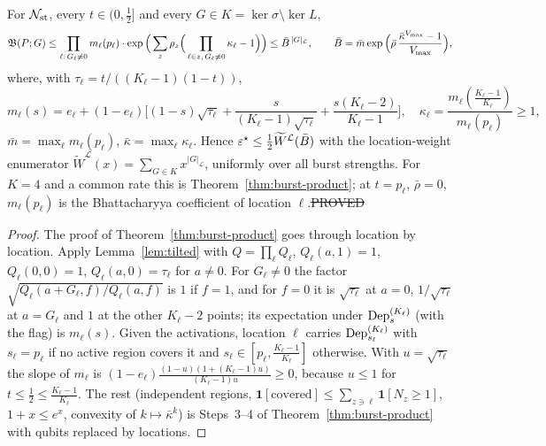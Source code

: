 \begin{theorem}\label{thm:st-burst}
For $\mathcal{N}_{\rm st}$, every $t\in(0,\tfrac12]$ and every $G\in K=\ker\sigma\setminus\ker L$,
\[
\mathfrak{B}(P;G)\le\prod_{\ell:\,G_\ell\ne0}m_\ell(p_\ell)\cdot\exp\Big(\sum_z\rho_z\Big(\prod_{\ell\in z,\,G_\ell\ne0}\kappa_\ell-1\Big)\Big)\le\bar B^{\,|G|_{\mathcal L}},\qquad
\bar B=\bar m\exp\Big(\bar\rho\,\frac{\bar\kappa^{V_{\max}}-1}{V_{\max}}\Big),
\]
where, with $\tau_\ell=t/((K_\ell-1)(1-t))$,
\[
m_\ell(s)=e_\ell+(1-e_\ell)\Big[(1-s)\sqrt{\tau_\ell}+\frac{s}{(K_\ell-1)\sqrt{\tau_\ell}}+\frac{s(K_\ell-2)}{K_\ell-1}\Big],\quad\kappa_\ell=\frac{m_\ell(\tfrac{K_\ell-1}{K_\ell})}{m_\ell(p_\ell)}\ge1,
\]
$\bar m=\max_\ell m_\ell(p_\ell)$, $\bar\kappa=\max_\ell\kappa_\ell$. Hence $\varepsilon^{\star}\le\tfrac12\widetilde W^{\mathcal L}(\bar B)$ with the location-weight enumerator $\widetilde W^{\mathcal L}(x)=\sum_{G\in K}x^{|G|_{\mathcal L}}$, uniformly over all burst strengths. For $K=4$ and a common rate this is Theorem~\ref{thm:burst-product}; at $t=p_\ell$, $\bar\rho=0$, $m_\ell(p_\ell)$ is the Bhattacharyya coefficient of location $\ell$.\hfill\st{PROVED}
\end{theorem}
\begin{proof}
The proof of Theorem~\ref{thm:burst-product} goes through location by location. Apply Lemma~\ref{lem:tilted} with $Q=\prod_\ell Q_\ell$, $Q_\ell(a,1)=1$, $Q_\ell(0,0)=1$, $Q_\ell(a,0)=\tau_\ell$ for $a\ne0$. For $G_\ell\ne0$ the factor $\sqrt{Q_\ell(a+G_\ell,f)/Q_\ell(a,f)}$ is $1$ if $f=1$, and for $f=0$ it is $\sqrt{\tau_\ell}$ at $a=0$, $1/\sqrt{\tau_\ell}$ at $a=G_\ell$ and $1$ at the other $K_\ell-2$ points; its expectation under $\mathrm{Dep}^{(K_\ell)}_s$ (with the flag) is $m_\ell(s)$.
Given the activations, location $\ell$ carries $\mathrm{Dep}^{(K_\ell)}_{s_\ell}$ with $s_\ell=p_\ell$ if no active region covers it and $s_\ell\in[p_\ell,\tfrac{K_\ell-1}{K_\ell}]$ otherwise. With $u=\sqrt{\tau_\ell}$ the slope of $m_\ell$ is $(1-e_\ell)\frac{(1-u)(1+(K_\ell-1)u)}{(K_\ell-1)u}\ge0$, because $u\le1$ for $t\le\tfrac12\le\tfrac{K_\ell-1}{K_\ell}$. The rest (independent regions, $\mathbf 1[\text{covered}]\le\sum_{z\ni\ell}\mathbf 1[N_z\ge1]$, $1+x\le e^x$, convexity of $k\mapsto\bar\kappa^k$) is Steps~3--4 of Theorem~\ref{thm:burst-product} with qubits replaced by locations.
\end{proof}

